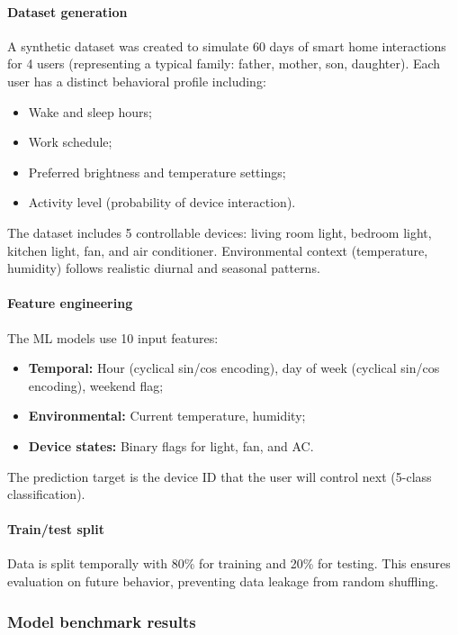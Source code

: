 \paragraph{Dataset generation}
A synthetic dataset was created to simulate 60 days of smart home interactions
for 4 users (representing a typical family: father, mother, son, daughter).
Each user has a distinct behavioral profile including:
\begin{itemize}
    \item Wake and sleep hours;
    \item Work schedule;
    \item Preferred brightness and temperature settings;
    \item Activity level (probability of device interaction).
\end{itemize}

The dataset includes 5 controllable devices: living room light, bedroom light,
kitchen light, fan, and air conditioner. Environmental context (temperature,
humidity) follows realistic diurnal and seasonal patterns.

\paragraph{Feature engineering}
The ML models use 10 input features:
\begin{itemize}
    \item \textbf{Temporal:} Hour (cyclical sin/cos encoding), day of week
    (cyclical sin/cos encoding), weekend flag;
    \item \textbf{Environmental:} Current temperature, humidity;
    \item \textbf{Device states:} Binary flags for light, fan, and AC.
\end{itemize}

The prediction target is the device ID that the user will control next
(5-class classification).

\paragraph{Train/test split}
Data is split temporally with 80\% for training and 20\% for testing. This
ensures evaluation on future behavior, preventing data leakage from random
shuffling.

\subsubsection{Model benchmark results}

